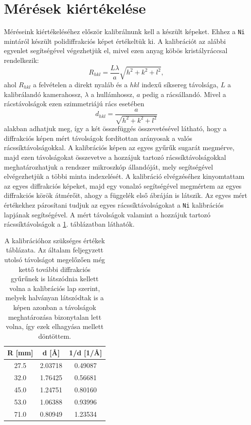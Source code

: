 \documentclass[12pt,a4paper]{article}
\begin{document}
\section{Mérések kiértékelése}
\hspace*{10pt} Méréseink kiértékeléséhez először kalibrálnunk kell a készült képeket. Ehhez a \texttt{Ni} mintáról készült polidiffrakciós képet értékeltük ki. A kalibrációt az alábbi egyenlet segítségével végezhetjük el, mivel ezen anyag köbös kristályráccsal rendelkezik:
\begin{equation}
R_{hkl} = \frac{L\lambda}{a}\sqrt{h^2+k^2+l^2},
\end{equation}
ahol $R_{hkl}$ a felvételen a direkt nyaláb és a $hkl$ indexű síksereg távolsága, $L$ a kalibrálandó kamerahossz, $\lambda$ a hullámhossz, $a$ pedig a rácsállandó. Mivel a rácstávolságok ezen szimmetriájú rács esetében 
\begin{equation}
d_{hkl} = \frac{a}{\sqrt{h^2+k^2+l^2}}
\end{equation}
alakban adhatjuk meg, így a két összefüggés összevetésével látható, hogy a diffrakciós képen mért távolságok fordítottan arányosak a valós rácssíktávolságokkal. A kalibrációs képen az egyes gyűrűk sugarát megmérve, majd ezen távolságokat összevetve a hozzájuk tartozó rácssíktávolságokkal meghatározhatjuk a rendszer mikroszkóp állandóját, mely segítségével elvégezhetjük a többi minta indexelését.
\hspace*{10pt} A kalibráció elvégzéséhez kinyomtattam az egyes diffrakciós képeket, majd egy vonalzó segítségével megmértem az egyes diffrakciós körök átmérőit, ahogy a függelék első ábráján is látszik. Az egyes mért értékekhez párosítani tudjuk az egyes rácssíktávolságokat a \texttt{Ni} kalibrációs lapjának segítségével. A mért távolságok valamint a hozzájuk tartozó rácssíktávolságok a \ref{tab:kalib}. táblázatban láthatók.\\
\begin{table}[!h]
\begin{center}
\begin{tabular}{|c|c|c|}
\hline
R [mm] & d [\AA] & 1/d [1/\AA]\\
\hline
27.5 & 2.03718 & 0.49087\\
\hline
32.0 & 1.76425 & 0.56681\\
\hline
45.0 & 1.24751 & 0.80160\\
\hline
53.0 & 1.06388 & 0.93996\\
\hline
71.0 & 0.80949 & 1.23534\\
\hline
\end{tabular}
\caption{A kalibrációhoz szükséges értékek táblázata. Az általam feljegyzett utolsó távolságot megelőzően még kettő további diffrakciós gyűrűnek is látszódnia kellett volna a kalibrációs lap szerint, melyek halványan látszódtak is a képen azonban a távolságok meghatározása bizonytalan lett volna, így  ezek elhagyása mellett döntöttem.}
\label{tab:kalib}
\end{center}
\end{table}
\end{document}
